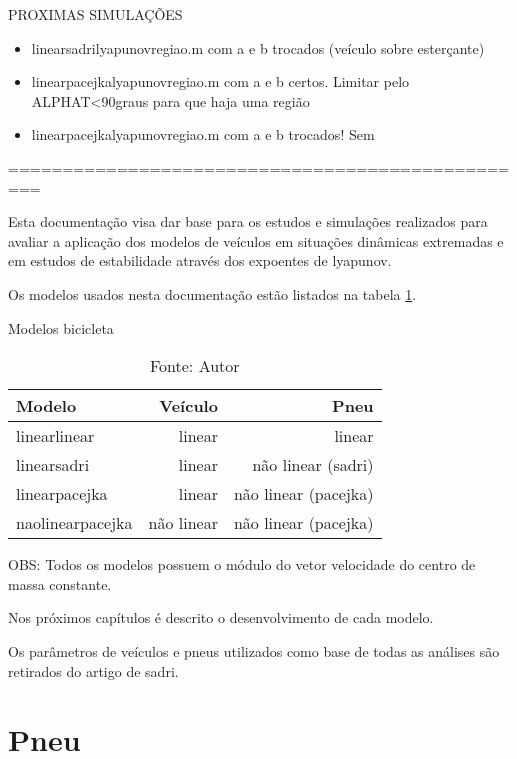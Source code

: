 \documentclass[sublist]{fei}
\begin{document}
PROXIMAS SIMULAÇÕES

\begin{itemize}
\item linearsadrilyapunovregiao.m com a e b trocados (veículo sobre esterçante)
\item linearpacejkalyapunovregiao.m com a e b certos. Limitar pelo ALPHAT<90graus para que haja uma região
\item linearpacejkalyapunovregiao.m com a e b trocados! Sem 
\end{itemize}


=================================================

Esta documentação visa dar base para os estudos e simulações realizados para avaliar a aplicação dos modelos de veículos em situações dinâmicas extremadas e em estudos de estabilidade através dos expoentes de lyapunov.

Os modelos usados nesta documentação estão listados na tabela \ref{modelos}.

	\begin{table}[ht!] 
	\caption{Modelos bicicleta}
	\label{modelos}
	\begin{center}
	\begin{tabular}{lrr} 
	\hline
	Modelo		       	& Veículo			  	& Pneu	 				   	\\
	\hline
	linearlinear    	& linear		        & linear			       	\\
	linearsadri 		& linear		        & não linear (sadri) 		\\
	linearpacejka		& linear             	& não linear (pacejka)		\\
	naolinearpacejka	& não linear 			& não linear (pacejka)		\\
	\hline
	\end{tabular}
	\caption*{Fonte: Autor}
	\end{center}
	\end{table}

OBS: Todos os modelos possuem o módulo do vetor velocidade do centro de massa constante.

Nos próximos capítulos é descrito o desenvolvimento de cada modelo.

Os parâmetros de veículos e pneus utilizados como base de todas as análises são retirados do artigo de sadri.

\chapter{Pneu}
\end{document}
